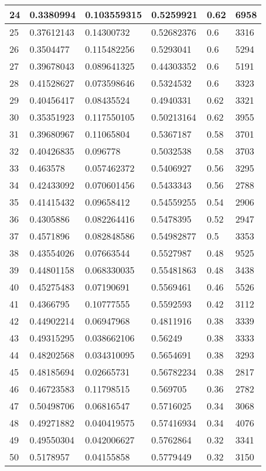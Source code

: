 \begin{longtable}{|l|l|l|l|l|l|}
24 & 0.3380994 & 0.103559315 & 0.5259921 & 0.62 & 6958 \\ \hline 
25 & 0.37612143 & 0.14300732 & 0.52682376 & 0.6 & 3316 \\ \hline 
26 & 0.3504477 & 0.115482256 & 0.5293041 & 0.6 & 5294 \\ \hline 
27 & 0.39678043 & 0.089641325 & 0.44303352 & 0.6 & 5191 \\ \hline 
28 & 0.41528627 & 0.073598646 & 0.5324532 & 0.6 & 3323 \\ \hline 
29 & 0.40456417 & 0.08435524 & 0.4940331 & 0.62 & 3321 \\ \hline 
30 & 0.35351923 & 0.117550105 & 0.50213164 & 0.62 & 3955 \\ \hline 
31 & 0.39680967 & 0.11065804 & 0.5367187 & 0.58 & 3701 \\ \hline 
32 & 0.40426835 & 0.096778 & 0.5032538 & 0.58 & 3703 \\ \hline 
33 & 0.463578 & 0.057462372 & 0.5406927 & 0.56 & 3295 \\ \hline 
34 & 0.42433092 & 0.070601456 & 0.5433343 & 0.56 & 2788 \\ \hline 
35 & 0.41415432 & 0.09658412 & 0.54559255 & 0.54 & 2906 \\ \hline 
36 & 0.4305886 & 0.082264416 & 0.5478395 & 0.52 & 2947 \\ \hline 
37 & 0.4571896 & 0.082848586 & 0.54982877 & 0.5 & 3353 \\ \hline 
38 & 0.43554026 & 0.07663544 & 0.5527987 & 0.48 & 9525 \\ \hline 
39 & 0.44801158 & 0.068330035 & 0.55481863 & 0.48 & 3438 \\ \hline 
40 & 0.45275483 & 0.07190691 & 0.5569461 & 0.46 & 5526 \\ \hline 
41 & 0.4366795 & 0.10777555 & 0.5592593 & 0.42 & 3112 \\ \hline 
42 & 0.44902214 & 0.06947968 & 0.4811916 & 0.38 & 3339 \\ \hline 
43 & 0.49315295 & 0.038662106 & 0.56249 & 0.38 & 3333 \\ \hline 
44 & 0.48202568 & 0.034310095 & 0.5654691 & 0.38 & 3293 \\ \hline 
45 & 0.48185694 & 0.02665731 & 0.56782234 & 0.38 & 2817 \\ \hline 
46 & 0.46723583 & 0.11798515 & 0.569705 & 0.36 & 2782 \\ \hline 
47 & 0.50498706 & 0.06816547 & 0.5716025 & 0.34 & 3068 \\ \hline 
48 & 0.49271882 & 0.040419575 & 0.57416934 & 0.34 & 4076 \\ \hline 
49 & 0.49550304 & 0.042006627 & 0.5762864 & 0.32 & 3341 \\ \hline 
50 & 0.5178957 & 0.04155858 & 0.5779449 & 0.32 & 3150 \\ \hline 
\end{longtable}